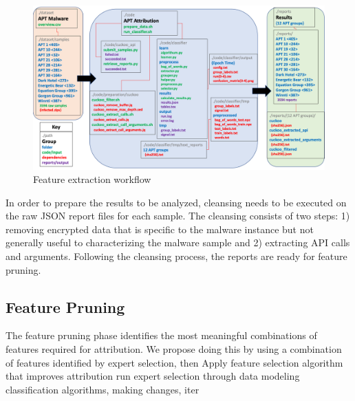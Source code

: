 \documentclass[12pt]{report}
\begin{document}
\begin{figure}
	\centering
	\includegraphics[width=1\textwidth]{images/APTAttribution-codebase-flow.png}
	\caption{Feature extraction workflow  \protect\cite{APTAttribution2022}}
	\label{fig:APTAttribution-codebase}
\end{figure}

In order to prepare the results to be analyzed, cleansing needs to be executed on the raw JSON report files for each sample.  The cleansing consists of two steps:  1) removing encrypted data that is specific to the malware instance but not generally useful to characterizing the malware sample and 2) extracting API calls and arguments.  Following the cleansing process, the reports are ready for feature pruning.  

\subsection{Feature Pruning}

The feature pruning phase identifies the most meaningful combinations of features required for attribution.  We propose doing this by using a combination of features identified by expert selection, then Apply feature selection algorithm that improves attribution
     run expert selection through data modeling classification algorithms, making changes, iter
\end{document}
